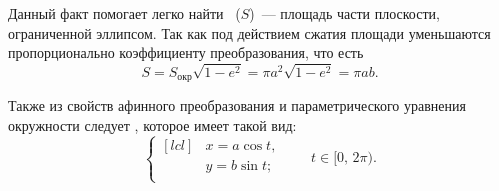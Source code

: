 Данный факт помогает легко найти ~($S$)~--- площадь части
плоскости, ограниченной эллипсом. Так как под действием сжатия площади уменьшаются пропорционально коэффициенту преобразования, что есть
\begin{equation}
	S = S_\text{окр} \sqrt{1 - e^2} = \pi a^2 \sqrt{1 - e^2} = \pi a b.
\end{equation}

Также из свойств афинного преобразования и параметрического уравнения окружности следует , которое имеет такой вид:
\begin{equation}
	\left\{
	\begin{aligned}[lcl]
		&x=a\cos t,\\
		&y=b\sin t;\\
	\end{aligned}
	\right. \quad\quad t \in [0, \, 2\pi).
\end{equation}

